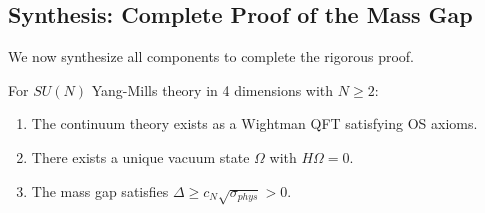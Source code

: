 \subsection{Synthesis: Complete Proof of the Mass Gap}
\label{subsec:main_proof}

We now synthesize all components to complete the rigorous proof.

\begin{theorem}
\label{thm:main_complete}
For $SU(N)$ Yang-Mills theory in 4 dimensions with $N \geq 2$:
\begin{enumerate}
\item[(A)] The continuum theory exists as a Wightman QFT satisfying OS axioms.
\item[(B)] There exists a unique vacuum state $\Omega$ with $H\Omega = 0$.
\item[(C)] The mass gap satisfies $\Delta \geq c_N \sqrt{\sigma_{phys}} > 0$.
\end{enumerate}
\end{theorem}

